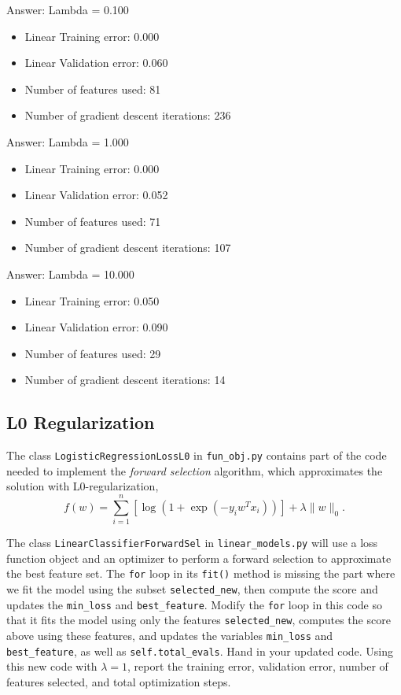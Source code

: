 \documentclass{article}
\def\ans#1{\par\gre{Answer: #1}}
\def\blu#1{{\color{blu}#1}}
\def\gre#1{{\color{gre}#1}}
\def\norm#1{\|#1\|}
\let\ask\blu
\begin{document}
\ans{
Lambda = 0.100
\begin{itemize}
    \item Linear Training error: 0.000
    \item Linear Validation error: 0.060
    \item Number of features used: 81
    \item Number of gradient descent iterations: 236
\end{itemize}
}

\ans{
Lambda = 1.000
\begin{itemize}
    \item Linear Training error: 0.000
    \item Linear Validation error: 0.052
    \item Number of features used: 71
    \item Number of gradient descent iterations: 107
\end{itemize}
}
\ans{
Lambda = 10.000
\begin{itemize}
    \item Linear Training error: 0.050
    \item Linear Validation error: 0.090
    \item Number of features used: 29
    \item Number of gradient descent iterations: 14
\end{itemize}
}
\pagebreak

\subsection{L0 Regularization }

The class \verb|LogisticRegressionLossL0| in \verb|fun_obj.py| contains part of the code needed to implement the \emph{forward selection} algorithm,
which approximates the solution with L0-regularization,
\[
f(w) =  \sum_{i=1}^n \left[\log(1+\exp(-y_iw^Tx_i))\right] + \lambda\norm{w}_0.
\]

The class \verb|LinearClassifierForwardSel| in \verb|linear_models.py| will use a loss function object and an optimizer to perform a forward selection to approximate the best feature set.
The \verb|for| loop in its \verb|fit()| method is missing the part where we fit the model using the subset \verb|selected_new|,
then compute the score and updates the \verb|min_loss| and \verb|best_feature|.
Modify the \verb|for| loop in this code so that it fits the model using only
the features \verb|selected_new|, computes the score above using these features,
and updates the variables \verb|min_loss| and \verb|best_feature|,
as well as \verb|self.total_evals|.
\ask{Hand in your updated code. Using this new code with $\lambda=1$,
report the training error, validation error, number of features selected, and total optimization steps.}
\end{document}
